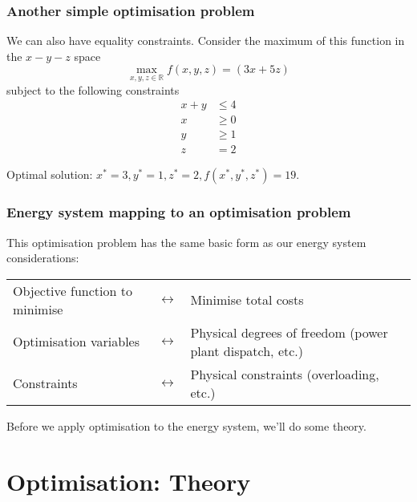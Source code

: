 \documentclass[10pt,aspectratio=169,dvipsnames]{beamer}
\newcommand{\ra}[1]{\renewcommand{\arraystretch}{#1}}
\begin{document}
\begin{frame}
  \frametitle{Another simple optimisation problem}

  We can also have equality constraints. Consider the maximum of this function in the $x-y-z$ space
  \begin{equation*}
    \max_{x,y,z\in \mathbb{R}} f(x,y,z) =  (3x + 5z)
  \end{equation*}
  subject to the following constraints
  \begin{align*}
    x + y & \leq 4 \\
    x & \geq 0 \\
    y & \geq 1 \\
    z & = 2
  \end{align*}

  \pause
  \alert{Optimal solution:} $x^* = 3, y^* = 1, z^* = 2, f(x^*,y^*,z^*) = 19$.
\end{frame}

\begin{frame}
  \frametitle{Energy system mapping to an optimisation problem}

  This optimisation problem has the same basic form as our energy system considerations:
  \ra{1.05}
  \begin{table}[!t]
    \begin{tabular}{p{6cm}p{0.5cm}p{6cm}}
      \toprule
      \alert{Objective function to minimise} & \vspace{.4cm}$\leftrightarrow$  &  \alert{Minimise total costs} \\
      \alert{Optimisation variables} & \vspace{.4cm} $\leftrightarrow$ &  \alert{Physical degrees of freedom (power plant dispatch, etc.)} \\
      \alert{Constraints} &\vspace{.4cm}  $\leftrightarrow$  &  \alert{Physical constraints (overloading, etc.)} \\
      \bottomrule
    \end{tabular}
  \end{table}

  Before we apply optimisation to the energy system, we'll do some \alert{theory}.

\end{frame}




\section{Optimisation: Theory}
\end{document}
